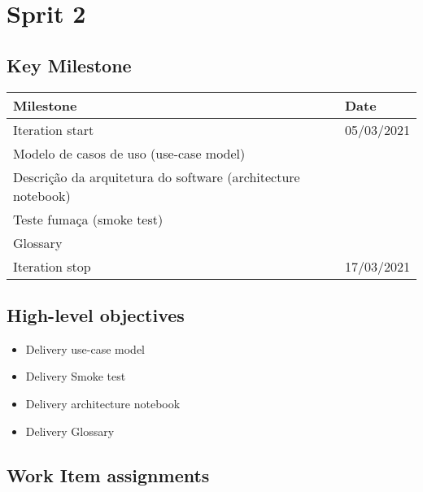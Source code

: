 \clearpage
\section{Sprit 2}

\subsection*{Key Milestone}


\noindent\begin{tabular}{|l|l|}
\hline
Milestone       & Date \\ \hline
Iteration start & 05/03/2021 \\ \hline
Modelo de casos de uso (use-case model) &      \\ \hline
Descrição da arquitetura do software (architecture notebook) &      \\ \hline
Teste fumaça (smoke test) & \\ \hline
Glossary & \\ \hline
Iteration stop  & 17/03/2021 \\ \hline
\end{tabular}

\subsection*{High-level objectives}


\begin{itemize}
	\item	Delivery use-case model
	\item	Delivery Smoke test
	\item	Delivery architecture notebook
	\item Delivery Glossary
\end{itemize}

\subsection*{Work Item assignments}


